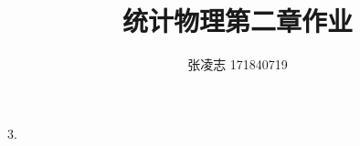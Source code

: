 \documentclass[UTF8,a4paper]{ctexart}
\begin{document}
 
	\title{统计物理第二章作业}
	\author{张凌志 171840719}
	\maketitle
	
	3.
	
\end{document}
